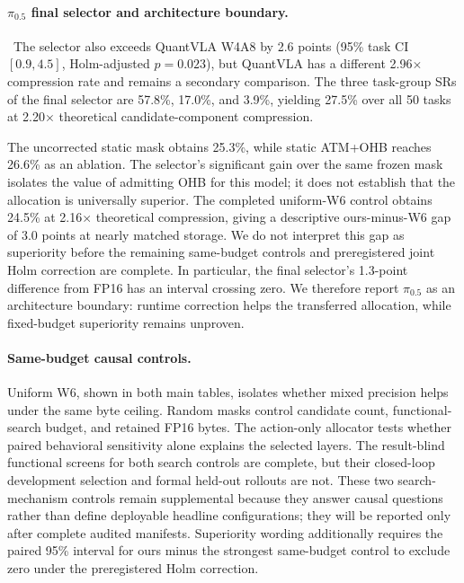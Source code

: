 \paragraph{$\pi_{0.5}$ final selector and architecture boundary.}
\PiSelectorResultStatus\ The selector also exceeds QuantVLA W4A8 by 2.6 points (95\% task CI $[0.9,4.5]$, Holm-adjusted $p=0.023$), but QuantVLA has a different 2.96$\times$ compression rate and remains a secondary comparison. The three task-group SRs of the final selector are 57.8\%, 17.0\%, and 3.9\%, yielding 27.5\% over all 50 tasks at 2.20$\times$ theoretical candidate-component compression.

The uncorrected static mask obtains 25.3\%, while static ATM+OHB reaches 26.6\% as an ablation. The selector's significant gain over the same frozen mask isolates the value of admitting OHB for this model; it does not establish that the allocation is universally superior. The completed uniform-W6 control obtains 24.5\% at 2.16$\times$ theoretical compression, giving a descriptive ours-minus-W6 gap of 3.0 points at nearly matched storage. We do not interpret this gap as superiority before the remaining same-budget controls and preregistered joint Holm correction are complete. In particular, the final selector's 1.3-point difference from FP16 has an interval crossing zero. We therefore report $\pi_{0.5}$ as an architecture boundary: runtime correction helps the transferred allocation, while fixed-budget superiority remains unproven.

\paragraph{Same-budget causal controls.}
Uniform W6, shown in both main tables, isolates whether mixed precision helps under the same byte ceiling. Random masks control candidate count, functional-search budget, and retained FP16 bytes. The action-only allocator tests whether paired behavioral sensitivity alone explains the selected layers. The result-blind functional screens for both search controls are complete, but their closed-loop development selection and formal held-out rollouts are not. These two search-mechanism controls remain supplemental because they answer causal questions rather than define deployable headline configurations; they will be reported only after complete audited manifests. Superiority wording additionally requires the paired 95\% interval for ours minus the strongest same-budget control to exclude zero under the preregistered Holm correction. \SameBudgetControlStatus

